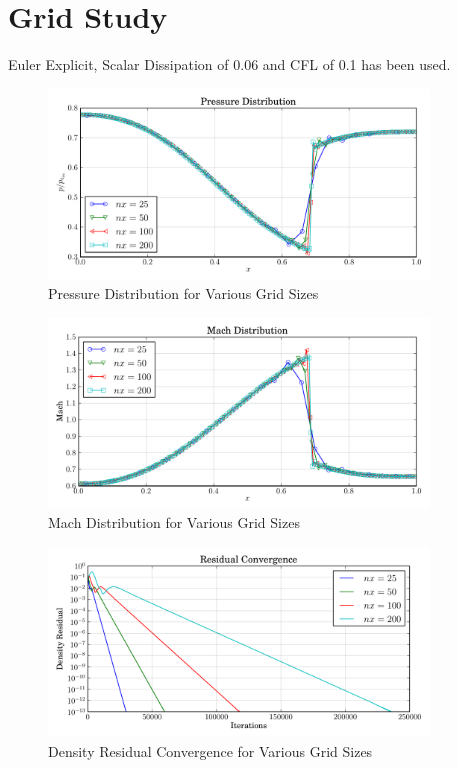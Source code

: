 \documentclass[letterpaper,12pt,]{article}
\begin{document}
\section{Grid Study}

Euler Explicit, Scalar Dissipation of 0.06 and CFL of 0.1 has been used.

\begin{figure}[!ht]
    \centering
    \includegraphics[width = 0.9\textwidth]{./figures/q3p.pdf}
    \caption {Pressure Distribution for Various Grid Sizes}
    \label{fig:q3p}
\end{figure}

\begin{figure}[!ht]
    \centering
    \includegraphics[width = 0.9\textwidth]{./figures/q3m.pdf}
    \caption {Mach Distribution for Various Grid Sizes}
    \label{fig:q3m}
\end{figure}

\begin{figure}[!ht]
    \centering
    \includegraphics[width = 0.9\textwidth]{./figures/q3c.pdf}
    \caption {Density Residual Convergence for Various Grid Sizes}
    \label{fig:q3p}
\end{figure}
\end{document}
